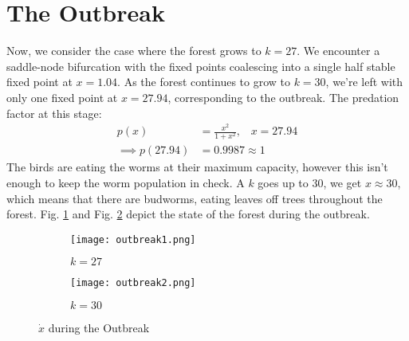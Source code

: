 \documentclass{article}
\begin{document}
\section{The Outbreak}
Now, we consider the case where the forest grows to $k=27$. We encounter a saddle-node bifurcation with the fixed points coalescing into a single half stable fixed point at $x=1.04$. As the forest continues to grow to $k=30$, we're left with only one fixed point at $x=27.94$, corresponding to the outbreak. The predation factor at this stage:
\begin{align}
    p(x) &= \frac{x^2}{1+x^2},\hspace{10pt} x=27.94\\
    \implies p(27.94) &= 0.9987 \approx 1
\end{align}
The birds are eating the worms at their maximum capacity, however this isn't enough to keep the worm population in check. A $k$ goes up to 30, we get $x\approx30$, which means that there are budworms, eating leaves off trees throughout the forest.
Fig. \ref{fig:o1} and Fig. \ref{fig:o2} depict the state of the forest during the outbreak.
\begin{figure}[H]
     \centering
     \begin{subfigure}[b]{0.4\textwidth}
         \centering
         \texttt{[image: outbreak1.png]}
         \caption{$k=27$}
         \label{fig:o1}
     \end{subfigure}
     \begin{subfigure}[b]{0.4\textwidth}
         \centering
         \texttt{[image: outbreak2.png]}
         \caption{$k=30$}
         \label{fig:o2}
     \end{subfigure}
             \caption{$\dot{x}$ during the Outbreak}
        \label{fig:outbreak}
\end{figure}
\end{document}

